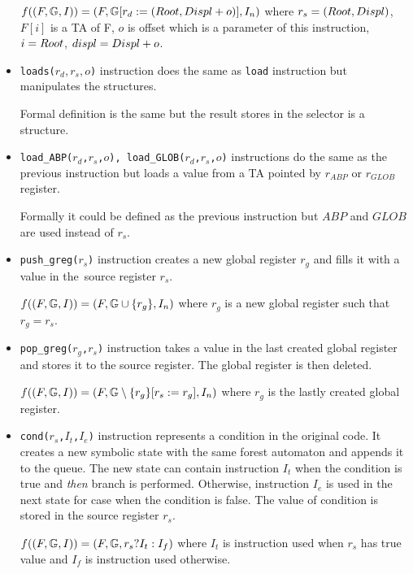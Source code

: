 \begin{itemize}
		$f(\stdsym) = \symstate{F}
			{\regssub{r_{d}}{
				\rreftuple{\droot}{\ddispl + o}
			}}
			{I_n}$
			where $\rrefreg{r_{s}}$,
			$F[i]$ is a TA of F,
			$o$ is offset which is a parameter of this instruction,
			$i=\droot$,
			$displ=\ddispl + o$.

		\item {\tt loads($r_d,r_s,o$)} instruction does the same as {\tt load} instruction but manipulates the structures.
		
		Formal definition is the same but the result stores in the selector is a structure.

	\item {\tt load\_ABP($r_d$,$r_s$,$o$), load\_GLOB($r_d$,$r_s$,$o$)} instructions do the same as
		the previous instruction but loads a value from a TA pointed by $r_{ABP}$ or $r_{GLOB}$ register.
		
		Formally it could be defined as the previous instruction but
		$ABP$ and $GLOB$ are used instead of $r_s$.

	\item {\tt push\_greg($r_s$)} instruction creates a new global register $r_g$
		and fills it with a value in the~source register $r_s$.
		
		$f(\stdsym) = \symstate{F}
		{\regs\cup \{r_g\}}
		{I_n}$
		where $r_g$ is a new global register such that $r_g = r_s$.
	
	\item {\tt pop\_greg($r_g$,$r_s$)} instruction takes a value in the last created
		global register and stores it to the source register.
		The global register is then deleted.
		
		$f(\stdsym) = \symstate{F}
		{\regssubmin{r_s}{r_g}{r_g}}
		{I_n}$
		where $r_g$ is the lastly created global register.

	\item {\tt cond($r_s$,$I_t$,$I_e$)} instruction represents a condition in the original code.
		It creates a new symbolic state with the same forest automaton and appends
		it to the queue.
		The new state can contain instruction $I_t$ when the condition is true
		and \emph{then} branch is performed.
		Otherwise, instruction $I_e$ is used in the next state for case when
		the condition is false.
		The value of condition is stored in the source register $r_s$.

		$f(\stdsym) = \symstate{F}{\regs}{r_s ? I_t : I_f}$
		where $I_t$ is instruction used when $r_s$ has true value and
		$I_f$ is instruction used otherwise.



\end{itemize}
